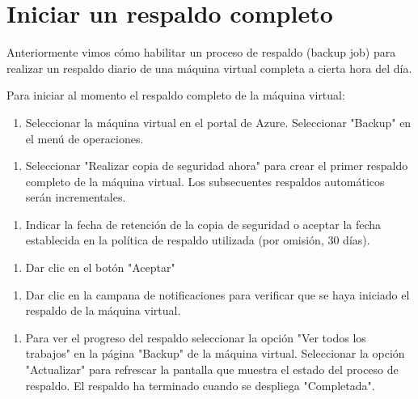 \section{Iniciar un respaldo completo}

Anteriormente vimos cómo habilitar un proceso de respaldo (backup job) para realizar un respaldo diario de una máquina virtual completa a cierta hora del día.

Para iniciar al momento el respaldo completo de la máquina virtual:

\begin{enumerate}
\item Seleccionar la máquina virtual en el portal de Azure. Seleccionar "Backup" en el menú de operaciones.
\end{enumerate}

\begin{enumerate}
\item Seleccionar "Realizar copia de seguridad ahora" para crear el primer respaldo completo de la máquina virtual. Los subsecuentes respaldos automáticos serán incrementales.
\end{enumerate}

\begin{enumerate}
\item Indicar la fecha de retención de la copia de seguridad o aceptar la fecha establecida en la política de respaldo utilizada (por omisión, 30 días).
\end{enumerate}

\begin{enumerate}
\item Dar clic en el botón "Aceptar"
\end{enumerate}

\begin{enumerate}
\item Dar clic en la campana de notificaciones para verificar que se haya iniciado el respaldo de la máquina virtual.
\end{enumerate}

\begin{enumerate}
\item Para ver el progreso del respaldo seleccionar la opción "Ver todos los trabajos" en la página "Backup" de la máquina virtual. Seleccionar la opción "Actualizar" para refrescar la pantalla que muestra el estado del proceso de respaldo. El respaldo ha terminado cuando se despliega "Completada".
\end{enumerate}

